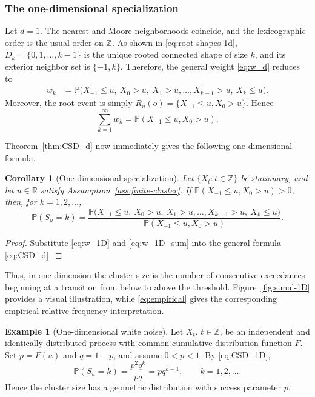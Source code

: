 \documentclass[aap,preprint]{imsart}
\theoremstyle{plain}
\newtheorem{corollary}[theorem]{Corollary}
\theoremstyle{definition}
\newtheorem{example}[theorem]{Example}
\def\R{{\mathbb R}}
\def\P{{\mathbb P}}
\def\Z{{\mathbb Z}}
\begin{document}
	\subsubsection{The one-dimensional specialization}
	
	Let $d=1$.  The nearest and Moore neighborhoods coincide, and the
	lexicographic order is the usual order on $\Z$.  As shown in
	\eqref{eq:root-shapes-1d}, $D_k=\{0,1,\ldots,k-1\}$ is the unique rooted
	connected shape of size $k$, and its exterior neighbor set is
	$\{-1,k\}$.  Therefore, the general weight \eqref{eq:w_d} reduces to
	\begin{equation}\label{eq:w_1D}
		\begin{split}
			w_k
			&=\P\bigl(X_{-1}\le u,\ X_0>u,\ X_1>u,\ldots,
			X_{k-1}>u,\ X_k\le u\bigr).
		\end{split}
	\end{equation}
	Moreover, the root event is simply
	$R_u(o)=\{X_{-1}\le u,X_0>u\}$.  Hence
	\begin{equation}\label{eq:w_1D_sum}
		\sum_{k=1}^{\infty}w_k
		=\P(X_{-1}\le u,X_0>u).
	\end{equation}
	
	
	Theorem~\ref{thm:CSD_d} now immediately gives the following one-dimensional
	formula.
	
	\begin{corollary}[One-dimensional specialization]\label{cor:CSD_1D}
		Let $\{X_t:t\in\Z\}$ be stationary, and let $u\in\R$ satisfy
		Assumption~\ref{ass:finite-cluster}.  If
		$\P(X_{-1}\le u,X_0>u)>0$, then, for $k=1,2,\ldots$,
		\begin{equation}\label{eq:CSD_1D}
			\P(S_u=k)
			=
			\frac{
				\P\bigl(X_{-1}\le u,\ X_0>u,\ X_1>u,\ldots,
				X_{k-1}>u,\ X_k\le u\bigr)}
			{\P(X_{-1}\le u,X_0>u)}.
		\end{equation}
	\end{corollary}
	
	\begin{proof}
		Substitute \eqref{eq:w_1D} and \eqref{eq:w_1D_sum} into the general formula
		\eqref{eq:CSD_d}.
	\end{proof}
	
	Thus, in one dimension the cluster size is the number of consecutive
	exceedances beginning at a transition from below to above the threshold.
	Figure~\ref{fig:simul-1D} provides a visual illustration, while
	\eqref{eq:empirical} gives the corresponding empirical relative frequency interpretation.
	
	\begin{example}[One-dimensional white noise]\label{example:WN_1D}
		Let $X_t$, $t\in\Z$, be an independent and identically distributed process
		with common cumulative distribution function $F$.  Set
		$p=F(u)$ and $q=1-p$, and assume $0<p<1$.  By
		\eqref{eq:CSD_1D},
		\begin{equation}\label{eq:WN_1D}
			\P(S_u=k)=\frac{p^2q^k}{pq}=pq^{k-1},
			\qquad k=1,2,\ldots.
		\end{equation}
		Hence the cluster size has a geometric distribution with success parameter
		$p$.
	\end{example}
	
\end{document}
